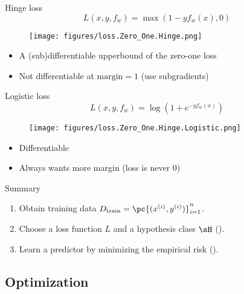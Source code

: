 \documentclass[usenames,dvipsnames,notes,11pt,aspectratio=169]{beamer}
\begin{document}
\begin{frame}
    {Hinge loss}
    $$
    L(x,y,f_w) = \max(1-yf_w(x), 0)
    $$
    \begin{figure}
        \texttt{[image: figures/loss.Zero\_One.Hinge.png]}
    \end{figure}
    \begin{itemize}
        \item A (sub)differentiable upperbound of the zero-one loss
        \item Not differentiable at $\text{margin}=1$ (use subgradients)
    \end{itemize}
\end{frame}

\begin{frame}
    {Logistic loss}
    $$
    L(x,y,f_w) = \log(1+e^{-yf_w(x)})
    $$
    \begin{figure}
        \texttt{[image: figures/loss.Zero\_One.Hinge.Logistic.png]}
    \end{figure}
    \begin{itemize}
        \item Differentiable
        \item Always wants more margin (loss is never 0)
    \end{itemize}
\end{frame}

\begin{frame}
    {Summary}
    \begin{enumerate}
        \itemsep2em
        \item Obtain training data $D_{\text{train}}=\pc{(x^{(i)}, y^{(i)})}_{i=1}^n$.
        \item Choose a loss function $L$ and a hypothesis class $\sH$ ().
        \item Learn a predictor by minimizing the empirical risk ().
    \end{enumerate}
\end{frame}


\subsection{Optimization}

\end{document}
